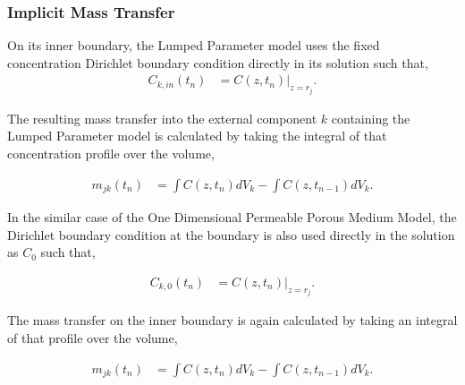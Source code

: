 \subsubsection{Implicit Mass Transfer}

On its inner boundary, the Lumped Parameter model uses the fixed concentration  
Dirichlet boundary condition directly in its solution such that, 
\begin{align}
C_{k,in}(t_n) &= C(z, t_n)|_{z=r_j}.
\end{align}

The resulting mass transfer into the external component $k$ containing the Lumped 
Parameter model is calculated by taking the integral of that concentration 
profile over the volume, 

\begin{align}
m_{jk}(t_n) &=\int C(z,t_n)dV_k - \int C(z, t_{n-1})dV_k.
\end{align}


In the similar case of the One Dimensional Permeable Porous Medium Model, 
the Dirichlet boundary condition at the boundary is also used directly in 
the solution as $C_0$ such that,

\begin{align}
  C_{k,0}(t_n) &= C(z, t_n)|_{z=r_j}.
\end{align}

The mass transfer on the inner boundary is again calculated by taking an 
integral of that profile over the volume,

\begin{align}
m_{jk}(t_n) &=\int C(z,t_n)dV_k - \int C(z, t_{n-1})dV_k.
\end{align}
